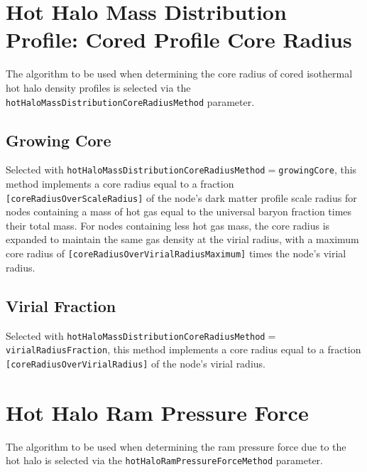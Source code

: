 \section{Hot Halo Mass Distribution Profile: Cored Profile Core Radius}\label{sec:hotHaloDensityProfileCoredIsothermalCoreRadius}

The algorithm to be used when determining the core radius of cored isothermal hot halo density profiles is selected via the {\tt hotHaloMassDistributionCoreRadiusMethod} parameter.

\subsection{Growing Core}\label{phys:hotHaloMassDistributionCoreRadius:hotHaloMassDistributionCoreRadiusGrowing}

Selected with {\tt hotHaloMassDistributionCoreRadiusMethod}$=${\tt growingCore}, this method implements a core radius equal to a fraction {\tt [coreRadiusOverScaleRadius]} of the node's dark matter profile scale radius for nodes containing a mass of hot gas equal to the universal baryon fraction times their total mass. For nodes containing less hot gas mass, the core radius is expanded to maintain the same gas density at the virial radius, with a maximum core radius of {\tt [coreRadiusOverVirialRadiusMaximum]} times the node's virial radius.

\subsection{Virial Fraction}\label{phys:hotHaloMassDistributionCoreRadius:hotHaloMassDistributionCoreRadiusVirialFraction}

Selected with {\tt hotHaloMassDistributionCoreRadiusMethod}$=${\tt virialRadiusFraction}, this method implements a core radius equal to a fraction {\tt [coreRadiusOverVirialRadius]} of the node's virial radius.

\section{Hot Halo Ram Pressure Force}\label{sec:HotHaloRamPressureForce}

The algorithm to be used when determining the ram pressure force due to the hot halo is selected via the {\tt hotHaloRamPressureForceMethod} parameter.


